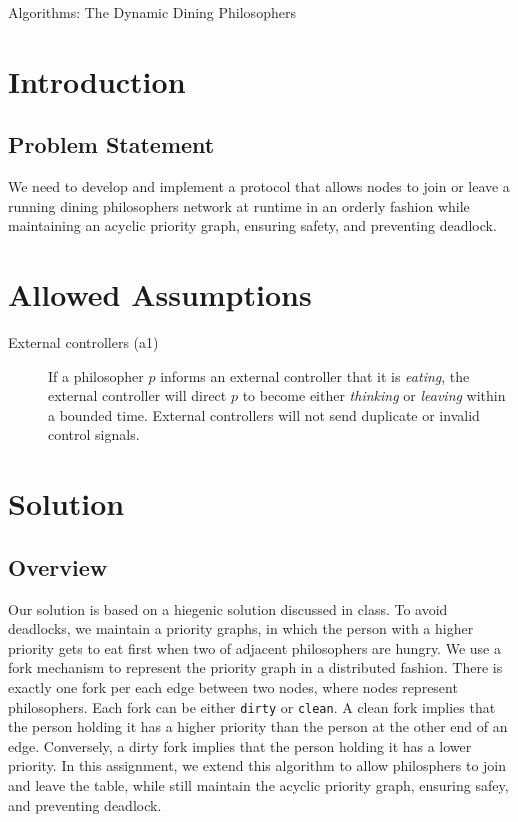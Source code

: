 \documentclass[11pt]{article}
\begin{document}
\pagestyle{fancy}


\begin{center} \Large Algorithms: The Dynamic Dining Philosophers \end{center}

\section{Introduction}


\subsection{Problem Statement}
We need to develop and implement a protocol that allows nodes to join or leave a running dining philosophers network at runtime in an orderly fashion while maintaining an acyclic priority graph, ensuring safety, and preventing deadlock.



\section{Allowed Assumptions}

\begin{description}
\item[External controllers (a1)]
If a philosopher $p$ informs an external controller that it is \emph{eating}, the external controller will direct $p$ to become either \emph{thinking} or \emph{leaving} within a bounded time.
External controllers will not send duplicate or invalid control signals.
\end{description}

\section{Solution}
\subsection{Overview}
Our solution is based on a hiegenic solution discussed in class. To avoid deadlocks, we maintain a priority graphs, in which the person with a higher priority gets to eat first when two of adjacent philosophers are hungry. We use a fork mechanism to represent the priority graph in a distributed fashion. There is exactly one fork per each edge between two nodes, where nodes represent philosophers. Each fork can be either \texttt{dirty} or \texttt{clean}. A clean fork implies that the person holding it has a higher priority than the person at the other end of an edge. Conversely, a dirty fork implies that the person holding it has a lower priority. In this assignment, we extend this algorithm to allow philosphers to join and leave the table, while still maintain the acyclic priority graph, ensuring safey, and preventing deadlock.
\end{document}
